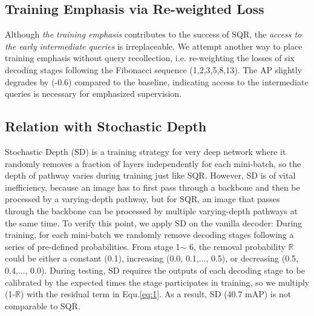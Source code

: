 \documentclass[10pt,twocolumn,letterpaper]{article}
\begin{document}
\begin{comment}
\begin{table}[t!]
\centering
    \begin{tabular}{c|c|c}
    \toprule[1pt]
        Methods &  \#$Supv$ / stage & AP \\ \midrule
        $6 \times \mathcal{PT}^{1\text{-}2\text{-}3\text{-}4\text{-}5\text{-}6}$ & 6,6,6,6,6,6 & 43.6 \\ 
        SQR & 1,2,3,5,8,13 & \textbf{44.4}\\
       \bottomrule
    \end{tabular}
    \caption{COCO validation AP of Adamixer R-50 trained with 6 groups of queries and SQR. Both are trained for 12 epochs and inferenced using the basic pathway.}
    \label{tab:num of supervision2}
\end{table}

\end{comment}


\subsection{Training Emphasis via Re-weighted Loss}
Although \textit{the training emphasis} contributes to the success of SQR, the \textit{access to the early intermediate queries} is irreplaceable. We attempt another way to place training emphasis without query recollection, i.e. re-weighting the losses of six decoding stages following the Fibonacci sequence (1,2,3,5,8,13). The AP slightly degrades by (-0.6) compared to the baseline, indicating access to the intermediate queries is necessary for emphasized supervision.

\subsection{Relation with Stochastic Depth}
Stochastic Depth (SD) \cite{Huang2016DeepNW} is a training strategy for very deep network where it randomly removes a fraction of layers independently for each mini-batch, so the depth of pathway varies during training just like SQR. However, SD is of vital inefficiency, because an image has to first pass through a backbone and then be processed by a varying-depth pathway, but for SQR, an image that passes through the backbone can be processed by multiple varying-depth pathways at the same time. To verify this point, we apply SD on the vanilla decoder: During training, for each mini-batch we randomly remove decoding stages following a series of pre-defined probabilities. From stage 1$\sim$ 6, the removal probability $\mathbb{R}$ could be either a constant (0.1), increasing (0.0, 0.1,..., 0.5), or decreasing (0.5, 0.4,..., 0.0). During testing, SD requires the outputs of each decoding stage to be calibrated by the expected times the stage participates in training, so we multiply (1-$\mathbb{R}$) with the residual term in Equ.\ref{eq:1}. As a result, SD (40.7 mAP) is not comparable to SQR. 
\end{document}
